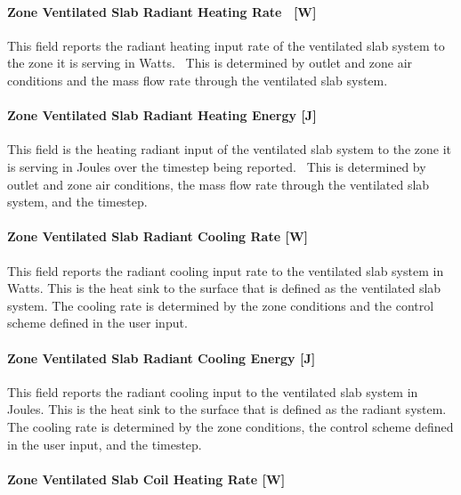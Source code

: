 \paragraph{Zone Ventilated Slab Radiant Heating Rate~ {[}W{]}}\label{zone-ventilated-slab-radiant-heating-rate-w}

This field reports the radiant heating input rate of the ventilated slab system to the zone it is serving in Watts.~ This is determined by outlet and zone air conditions and the mass flow rate through the ventilated slab system.

\paragraph{Zone Ventilated Slab Radiant Heating Energy {[}J{]}}\label{zone-ventilated-slab-radiant-heating-energy-j}

This field is the heating radiant input of the ventilated slab system to the zone it is serving in Joules over the timestep being reported.~ This is determined by outlet and zone air conditions, the mass flow rate through the ventilated slab system, and the timestep.

\paragraph{Zone Ventilated Slab Radiant Cooling Rate {[}W{]}}\label{zone-ventilated-slab-radiant-cooling-rate-w}

This field reports the radiant cooling input rate to the ventilated slab system in Watts. This is the heat sink to the surface that is defined as the ventilated slab system. The cooling rate is determined by the zone conditions and the control scheme defined in the user input.

\paragraph{Zone Ventilated Slab Radiant Cooling Energy {[}J{]}}\label{zone-ventilated-slab-radiant-cooling-energy-j}

This field reports the radiant cooling input to the ventilated slab system in Joules. This is the heat sink to the surface that is defined as the radiant system. The cooling rate is determined by the zone conditions, the control scheme defined in the user input, and the timestep.

\paragraph{Zone Ventilated Slab Coil Heating Rate {[}W{]}}\label{zone-ventilated-slab-coil-heating-rate-w}

